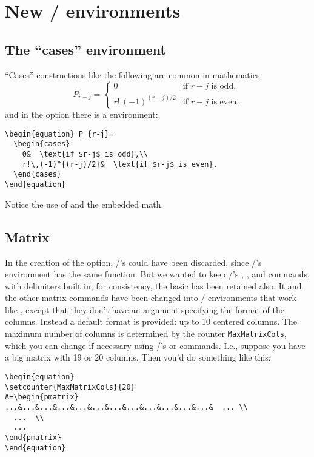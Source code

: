 \section{New  \latex/ environments}
\subsection{The ``cases'' environment}
``Cases'' constructions like the following are common in
mathematics:
\begin{equation} P_{r-j}=
  \left\{
  \begin{array}{ll}
    0                &\mbox{if $r-j$ is odd},\\
    r!\,(-1)^{(r-j)/2} &\mbox{if $r-j$ is even}.
  \end{array}
  \right.
\end{equation}
and in the  option there is a  environment:
\begin{verbatim}
\begin{equation} P_{r-j}=
  \begin{cases}
    0&  \text{if $r-j$ is odd},\\
    r!\,(-1)^{(r-j)/2}&  \text{if $r-j$ is even}.
  \end{cases}
\end{equation}
\end{verbatim}
Notice the use of  and the embedded math.

\subsection{Matrix}

In the creation of the  option, \amstex/'s 
could have been discarded, since \latex/'s  environment has
the same function.  But we wanted to keep \amstex/'s ,
,  and  commands, with delimiters
built in; for consistency, the basic  has been retained
also.  It and the other matrix commands have been changed into \latex/
environments that work like , except that they don't have
an argument specifying the format of the columns. Instead a default
format is provided: up to 10 centered columns. The maximum number of
columns is determined by the counter \verb"MaxMatrixCols", which you
can change if necessary using \latex/'s  or
 commands.  I.e., suppose you have a big
matrix with 19 or 20 columns.  Then you'd do something like this:
\begin{verbatim}
\begin{equation}
\setcounter{MaxMatrixCols}{20}
A=\begin{pmatrix}
...&...&...&...&...&...&...&...&...&...&...&...&  ... \\
  ...  \\
  ...
\end{pmatrix}
\end{equation}
\end{verbatim}

